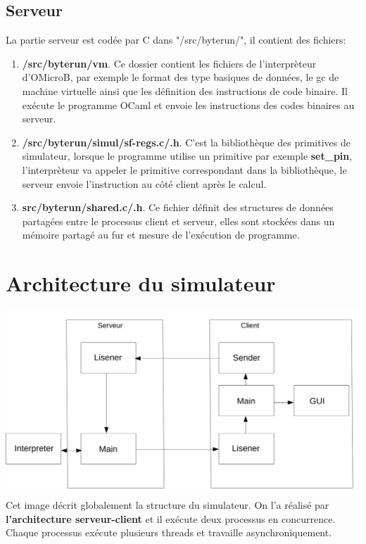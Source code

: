 \documentclass[14px]{article}
\begin{document}
\subsection{Serveur}
La partie serveur est codée par C dans "/src/byterun/", il contient des fichiers:
\begin{enumerate}
\item \textbf{/src/byterun/vm}.
Ce dossier contient les fichiers de l'interprèteur d'OMicroB, par exemple le format des type basiques de données, le gc de machine virtuelle ainsi que les définition des instructions de code binaire. Il exécute le programme OCaml et envoie les instructions des codes binaires au serveur.

\item \textbf{/src/byterun/simul/sf-regs.c/.h}.
C'est la bibliothèque des primitives de simulateur, lorsque le programme utilise un primitive par exemple \textbf{set\_pin}, l'interprèteur va appeler le primitive correspondant dans la bibliothèque, le serveur envoie l'instruction au côté client après le calcul.

\item \textbf{src/byterun/shared.c/.h}.
Ce fichier définit des structures de données partagées
entre le processus client et serveur, elles sont stockées dans un mémoire partagé au fur et mesure de l'exécution de programme.
\end{enumerate}


\clearpage
\pagestyle{fancy}
\rhead{\thepage}
\fancyfoot{}
\section{Architecture du simulateur}
\includegraphics[width=\textwidth]{simulator.png}\\[1cm]
Cet image décrit globalement la structure du simulateur. On l'a réalisé par \textbf{l'architecture serveur-client} et il exécute deux processus en concurrence. Chaque processus exécute plusieurs threads et travaille asynchroniquement.\\
\end{document}
